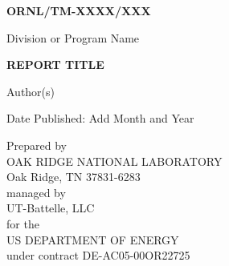\documentclass[11pt,letterpaper,twoside,english,final]{article}
\begin{document}
\newpage

\begin{titlepage}


\begin{flushright}{\textsf{\bfseries{\large{ORNL/TM-XXXX/XXX}}}}\\ 
\end{flushright}

\vspace{0.5in}

\begin{center}
Division or Program Name
\end{center}

\vspace{1.25in}

\begin{center}
{\bf{\large{REPORT TITLE}}}\\
\vspace{0.5in}

Author(s)

\vspace{1.35in}

Date Published: Add Month and Year 

\vspace{1.35in}

Prepared by \\
OAK RIDGE NATIONAL LABORATORY \\
Oak Ridge, TN 37831-6283 \\
managed by \\
UT-Battelle, LLC \\
for the \\
US DEPARTMENT OF ENERGY \\
under contract DE-AC05-00OR22725

\end{center}

\end{titlepage}


\clearemptydoublepage 
\begin{centering}
\tableofcontents 
\end{centering}



\setcounter{page}{3}

\newpage

\clearemptydoublepage
{} 
\begin{centering}
\listoffigures 
\end{centering}
\end{document}
